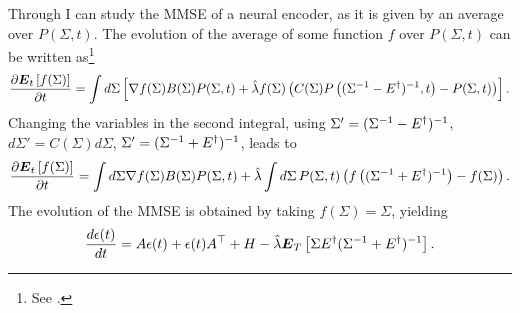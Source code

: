 Through  I can study the MMSE of a neural encoder, as it is given by an average over $P(\Sigma,t)$.
%
%
The evolution of the average of some function $f$ over $P(\Sigma,t)$ can be written as\footnote{See .}
\[
\frac{\partial \boldsymbol{E}_t\left[f(\Sigma)\right]}{\partial t} = \int d\Sigma \left[\nabla f(\Sigma) B(\Sigma) P(\Sigma,t) + \hat{\lambda}  f(\Sigma) \left(C(\Sigma)P\left((\Sigma^{-1} - E^\dagger)^{-1},t\right)  -P(\Sigma,t)\right)\right].
\]
Changing the variables in the second integral, using $\Sigma' = (\Sigma^{-1}-E^\dagger)^{-1}$, $d\Sigma' = C(\Sigma) d\Sigma$, $\Sigma' = (\Sigma^{-1}+E^\dagger)^{-1}$,
leads to
\[
\frac{\partial \boldsymbol{E}_t\left[f(\Sigma)\right]}{\partial t} = \int d\Sigma \nabla f(\Sigma) B(\Sigma) P(\Sigma,t) + \hat{\lambda} \int d\Sigma \,P(\Sigma,t)\left( f\left((\Sigma^{-1}+E^\dagger)^{-1}\right) -f(\Sigma)\right).
\]
The evolution of the MMSE is obtained by taking $f(\Sigma) = \Sigma$, yielding
\begin{equation}
\label{eq:epsilon_exact}
\frac{d\epsilon(t)}{dt} = A\epsilon(t) + \epsilon(t) A^\top + H -\hat{\lambda} \boldsymbol{E}_T\left[\Sigma \covar^\dagger (\Sigma^{-1}+\covar^\dagger)^{-1} \right].
\end{equation}
